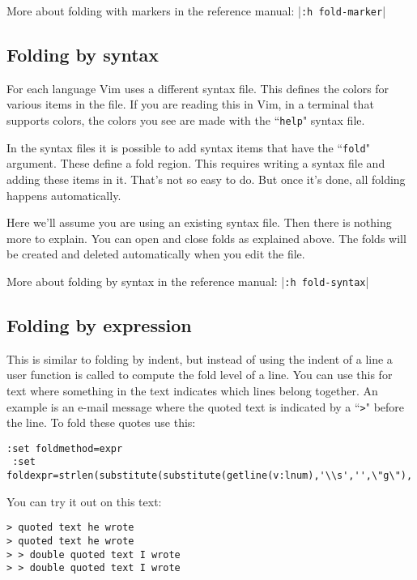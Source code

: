 More about folding with markers in the reference manual: |\texttt{:h fold-marker}|
\subsection{Folding by syntax}
For each language Vim uses a different syntax file.
This defines the colors for various items in the file.
If you are reading this in Vim, in a terminal that supports colors, the colors you see are made with the ``\texttt{help}" syntax file.

In the syntax files it is possible to add syntax items that have the ``\texttt{fold}" argument.
These define a fold region.
This requires writing a syntax file and adding these items in it.
That's not so easy to do.
But once it's done, all folding happens automatically.

Here we'll assume you are using an existing syntax file.
Then there is nothing more to explain.
You can open and close folds as explained above.
The folds will be created and deleted automatically when you edit the file.

More about folding by syntax in the reference manual: |\texttt{:h fold-syntax}|
\subsection{Folding by expression}
This is similar to folding by indent, but instead of using the indent of a line a user function is called to compute the fold level of a line.
You can use this for text where something in the text indicates which lines belong together.
An example is an e-mail message where the quoted text is indicated by a ``\texttt{>}" before the line.
To fold these quotes use this:

\begin{Verbatim}[samepage=true]
 :set foldmethod=expr
 :set foldexpr=strlen(substitute(substitute(getline(v:lnum),'\\s','',\"g\"),'[^>].*','',''))
\end{Verbatim}

You can try it out on this text:

\begin{Verbatim}[samepage=true]
> quoted text he wrote
> quoted text he wrote
> > double quoted text I wrote
> > double quoted text I wrote
\end{Verbatim}

